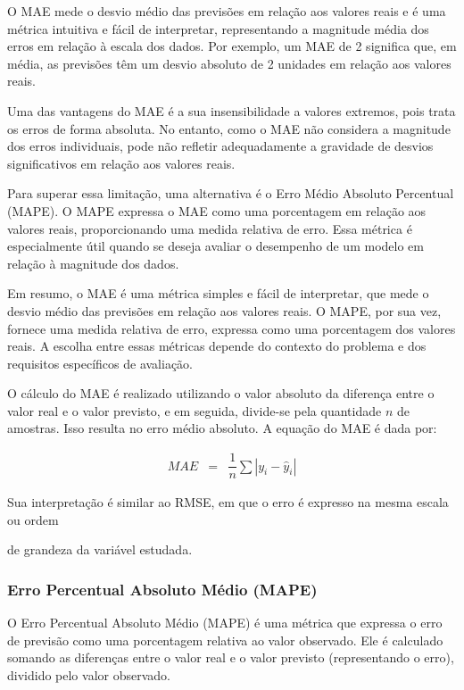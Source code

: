 O MAE mede o desvio médio das previsões em relação aos valores reais e é uma métrica intuitiva e fácil de interpretar, representando a magnitude média dos erros em relação à escala dos dados. Por exemplo, um MAE de 2 significa que, em média, as previsões têm um desvio absoluto de 2 unidades em relação aos valores reais.

Uma das vantagens do MAE é a sua insensibilidade a valores extremos, pois trata os erros de forma absoluta. No entanto, como o MAE não considera a magnitude dos erros individuais, pode não refletir adequadamente a gravidade de desvios significativos em relação aos valores reais.

Para superar essa limitação, uma alternativa é o Erro Médio Absoluto Percentual (MAPE). O MAPE expressa o MAE como uma porcentagem em relação aos valores reais, proporcionando uma medida relativa de erro. Essa métrica é especialmente útil quando se deseja avaliar o desempenho de um modelo em relação à magnitude dos dados.

Em resumo, o MAE é uma métrica simples e fácil de interpretar, que mede o desvio médio das previsões em relação aos valores reais. O MAPE, por sua vez, fornece uma medida relativa de erro, expressa como uma porcentagem dos valores reais. A escolha entre essas métricas depende do contexto do problema e dos requisitos específicos de avaliação.

O cálculo do MAE é realizado utilizando o valor absoluto da diferença entre o valor real e o valor previsto, e em seguida, divide-se pela quantidade $n$ de amostras. Isso resulta no erro médio absoluto. A equação do MAE é dada por:

\begin{eqnarray}
	M A E &=& \dfrac{1}{n} \sum\left|y_i-\hat{y}_i\right|\label{eq:mae}
\end{eqnarray}

Sua interpretação é similar ao RMSE, em que o erro é expresso na mesma escala ou ordem

de grandeza da variável estudada.

\subsubsection{Erro Percentual Absoluto M\'edio (MAPE)}

O Erro Percentual Absoluto Médio (MAPE) é uma métrica que expressa o erro de previsão como uma porcentagem relativa ao valor observado. Ele é calculado somando as diferenças entre o valor real e o valor previsto (representando o erro), dividido pelo valor observado.

